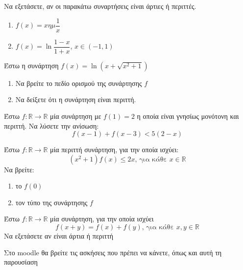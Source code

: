 \documentclass{presentation}
\begin{document}
\begin{askisi}
  Να εξετάσετε, αν οι παρακάτω συναρτήσεις είναι άρτιες ή περιττές.
  \begin{enumerate}
    \item $f(x)=xημ\dfrac{1}{x}$ \pause
    \item $f(x)=\ln \dfrac{1-x}{1+x}$, $x\in (-1,1)$
  \end{enumerate}

\end{askisi}

\begin{askisi}
  Έστω η συνάρτηση $f(x)=\ln (x+\sqrt{x^2+1})$
  \begin{enumerate}
    \item Να βρείτε το πεδίο ορισμού της συνάρτησης $f$ \pause
    \item Να δείξετε ότι η συνάρτηση είναι περιττή.
  \end{enumerate}

\end{askisi}

\begin{askisi}
  Έστω $f:\mathbb{R}\to\mathbb{R}$ μία συνάρτηση με $f(1)=2$ η οποία είναι γνησίως μονότονη και περιττή. Να λύσετε την ανίσωση:
  $$f(x-1)+f(x-3)<5(2-x)$$

\end{askisi}

\begin{askisi}
  Έστω $f:\mathbb{R}\to\mathbb{R}$ μία περιττή συνάρτηση, για την οποία ισχύει:
  $$(x^2+1)f(x)\le 2x \text{, για κάθε } x\in\mathbb{R}$$
  Να βρείτε:
  \begin{enumerate}
    \item το $f(0)$ \pause
    \item τον τύπο της συνάρτησης $f$
  \end{enumerate}

\end{askisi}

\begin{askisi}
  Έστω $f:\mathbb{R}\to\mathbb{R}$ μία συνάρτηση, για την οποία ισχύει
  $$f(x+y)=f(x)+f(y)\text{, για κάθε } x,y\in\mathbb{R}$$
  Να εξετάσετε αν είναι άρτια ή περιττή

\end{askisi}

\begin{frame}
  Στο moodle θα βρείτε τις ασκήσεις που πρέπει να κάνετε, όπως και αυτή τη παρουσίαση
\end{frame}
\end{document}

